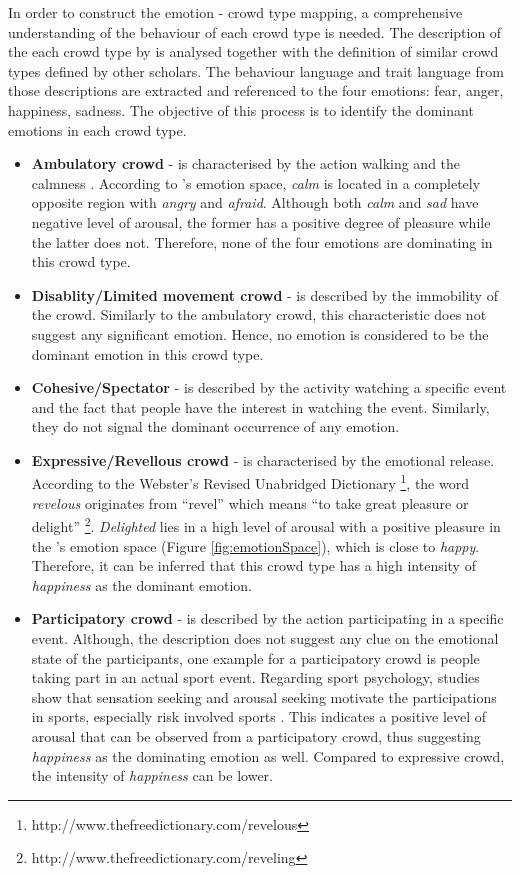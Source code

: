 In order to construct the emotion - crowd type mapping, a comprehensive understanding of the behaviour of each crowd type is needed. The description of the each crowd type by \citet{Berlonghi1995} is analysed together with the definition of similar crowd types defined by other scholars. The behaviour language and trait language from those descriptions are extracted and referenced to the four emotions: fear, anger, happiness, sadness. The objective of this process is to identify the dominant emotions in each crowd type. 

\begin{itemize}
\item \textbf{Ambulatory crowd} - is characterised by the action walking and the calmness \citep{Zeitz2009}. According to \citet{russell1980circumplex}'s emotion space, \textit{calm} is located in a completely opposite region with \textit{angry} and \textit{afraid}. Although both \textit{calm} and \textit{sad} have negative level of arousal, the former has a positive degree of pleasure while the latter does not. Therefore, none of the four emotions are dominating in this crowd type.
\item \textbf{Disablity/Limited movement crowd} - is described by the immobility of the crowd. Similarly to the ambulatory crowd, this characteristic does not suggest any significant emotion. Hence, no emotion is considered to be the dominant emotion in this crowd type.
\item \textbf{Cohesive/Spectator} - is described by the activity watching a specific event and the fact that people have the interest in watching the event. Similarly, they do not signal the dominant occurrence of any emotion.
\item \textbf{Expressive/Revellous crowd} - is characterised by the emotional release. According to the Webster's Revised Unabridged Dictionary \footnote{http://www.thefreedictionary.com/revelous}, the word \textit{revelous} originates from ``revel'' which means ``to take great pleasure or delight'' \footnote{http://www.thefreedictionary.com/reveling}. \textit{Delighted} lies in a high level of arousal with a positive pleasure in the \citet{russell1980circumplex}'s emotion space (Figure \ref{fig:emotionSpace}), which is close to \textit{happy}. Therefore, it can be inferred that this crowd type has a high intensity of \textit{happiness} as the dominant emotion.
\item \textbf{Participatory crowd} - is described by the action participating in a specific event. Although, the description does not suggest any clue on the emotional state of the participants, one example for a participatory crowd is people taking part in an actual sport event. Regarding sport psychology, studies show that sensation seeking and arousal seeking motivate the participations in sports, especially risk involved sports \citep{rowland1986sensation}. This indicates a positive level of arousal that can be observed from a participatory crowd, thus suggesting \textit{happiness} as the dominating emotion as well. Compared to expressive crowd, the intensity of \textit{happiness} can be lower.

\end{itemize}
